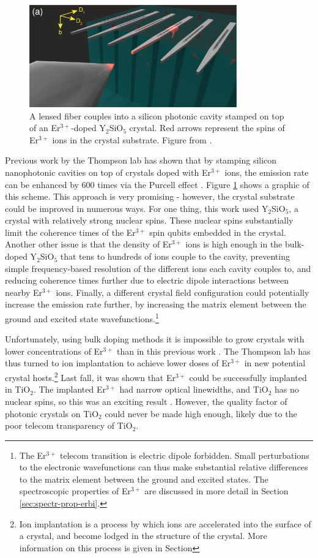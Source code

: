 \documentclass[12pt]{puthesis}
\newcommand{\erbium}[1][ ]{Er$^{3+}$#1}
\newcommand{\YSO}[1][ ]{Y$_{2}$SiO$_{5}$#1}
\newcommand{\TiO}[1][ ]{TiO$_{2}$#1}
\begin{document}
\begin{figure}[b]
  \centering
  \includegraphics[width=0.8\textwidth]{Nanophotonics}
  \caption{A lensed fiber couples into a silicon photonic cavity stamped on top of an \erbium[]-doped \YSO crystal. Red arrows represent the spins of \erbium ions in the crystal substrate. Figure from \cite{Dibos2017}.}
  \label{fig:cavity}
\end{figure}


Previous work by the Thompson lab has shown that by stamping silicon nanophotonic cavities on top of crystals doped with \erbium ions, the emission rate can be enhanced by 600 times via the Purcell effect \cite{Dibos2017}. Figure \ref{fig:cavity} shows a graphic of this scheme. This approach is very promising - however, the crystal substrate could be improved in numerous ways. For one thing, this work used \YSO[], a crystal with relatively strong nuclear spins. These nuclear spins substantially limit the coherence times of the \erbium spin qubits embedded in the crystal. Another other issue is that the density of \erbium ions is high enough in the bulk-doped \YSO that tens to hundreds of ions couple to the cavity, preventing simple frequency-based resolution of the different ions each cavity couples to, and reducing coherence times further due to electric dipole interactions between nearby \erbium ions. Finally, a different crystal field configuration could potentially increase the emission rate further, by increasing the matrix element between the ground and excited state wavefunctions.\footnote{The \erbium telecom transition is electric dipole forbidden. Small perturbations to the electronic wavefunctions can thus make substantial relative differences to the matrix element between the ground and excited states. The spectroscopic properties of \erbium are discussed in more detail in Section \ref{sec:spectr-prop-erbi}.}

Unfortunately, using bulk doping methods it is impossible to grow crystals with lower concentrations of \erbium than in this previous work \cite{Dibos2017}. The Thompson lab has thus turned to ion implantation to achieve lower doses of \erbium in new potential crystal hosts.\footnote{Ion implantation is a process by which ions are accelerated into the surface of a crystal, and become lodged in the structure of the crystal. More information on this process is given in Section } Last fall, it was shown that \erbium could be successfully implanted in \TiO[]. The implanted \erbium had narrow optical linewidths, and \TiO has no nuclear spins, so this was an exciting result \cite{Phenicie2019}. However, the quality factor of photonic crystals on \TiO could never be made high enough, likely due to the poor telecom transparency of \TiO[].
\end{document}
